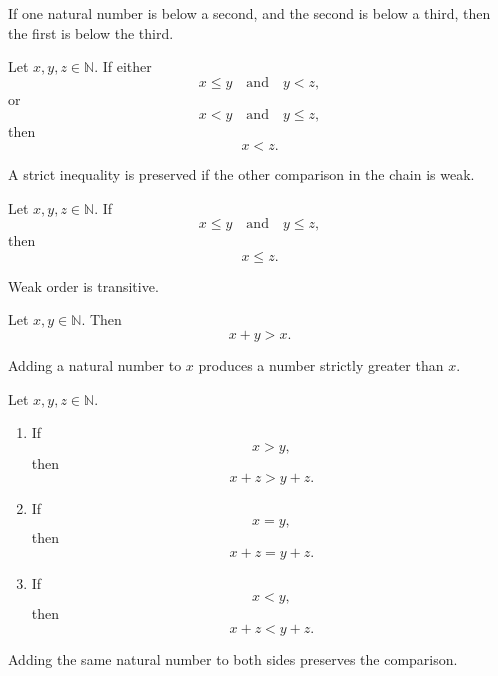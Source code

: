\begin{remark*}[Interpretation]
If one natural number is below a second, and the second is below a third, then the first is below the third.
\end{remark*}

\begin{theorem}
\label{thm:mixed-transitivity}
Let \(x,y,z \in \mathbb{N}\). If either
\[
x \le y
\quad \text{and} \quad
y < z,
\]
or
\[
x < y
\quad \text{and} \quad
y \le z,
\]
then
\[
x < z.
\]
\end{theorem}

\begin{remark*}[Interpretation]
A strict inequality is preserved if the other comparison in the chain is weak.
\end{remark*}

\begin{theorem}
\label{thm:transitivity-of-weak-ordering}
Let \(x,y,z \in \mathbb{N}\). If
\[
x \le y
\quad \text{and} \quad
y \le z,
\]
then
\[
x \le z.
\]
\end{theorem}

\begin{remark*}[Interpretation]
Weak order is transitive.
\end{remark*}

\begin{theorem}
\label{thm:addition-produces-a-greater-number}
Let \(x,y \in \mathbb{N}\). Then
\[
x + y > x.
\]
\end{theorem}

\begin{remark*}[Interpretation]
Adding a natural number to \(x\) produces a number strictly greater than \(x\).
\end{remark*}

\begin{theorem}
\label{thm:addition-preserves-order}
Let \(x,y,z \in \mathbb{N}\).
\begin{enumerate}[label=(\alph*)]
\item If
\[
x > y,
\]
then
\[
x + z > y + z.
\]

\item If
\[
x = y,
\]
then
\[
x + z = y + z.
\]

\item If
\[
x < y,
\]
then
\[
x + z < y + z.
\]
\end{enumerate}
\end{theorem}

\begin{remark*}[Interpretation]
Adding the same natural number to both sides preserves the comparison.
\end{remark*}